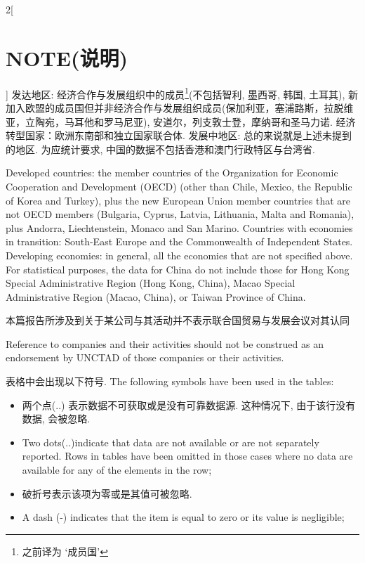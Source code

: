 \documentclass[a4paper, UTF8, 12pt]{article}
\begin{document}
\begin{paracol}{2}[\section{NOTE(说明)}]
    \switchcolumn*
    发达地区: 经济合作与发展组织中的成员\footnote{之前译为 `成员国'}(不包括智利, 墨西哥, 韩国, 土耳其), 新加入欧盟的成员国但并非经济合作与发展组织成员\footnotemark[3](保加利亚，塞浦路斯，拉脱维亚，立陶宛，马耳他和罗马尼亚), 安道尔，列支敦士登，摩纳哥和圣马力诺. 经济转型国家：欧洲东南部和独立国家联合体.
    发展中地区: 总的来说就是上述未提到的地区. 为应统计要求, 中国的数据不包括香港和澳门行政特区与台湾省.


    \switchcolumn
    Developed countries: the member countries of the Organization for Economic Cooperation and Development (OECD) (other than Chile, Mexico, the Republic of Korea and Turkey), plus the new European Union member countries that are not OECD members (Bulgaria, Cyprus, Latvia, Lithuania, Malta and Romania), plus Andorra, Liechtenstein, Monaco and San Marino. Countries with economies in transition: South-East Europe and the Commonwealth of Independent States. Developing economies: in general, all the economies that are not specified above. For statistical purposes, the data for China do not include those for Hong Kong Special Administrative Region (Hong Kong, China), Macao Special Administrative Region (Macao, China), or Taiwan Province of China. 

    \switchcolumn*
    本篇报告所涉及到关于某公司与其活动并不表示联合国贸易与发展会议对其认同

    \switchcolumn
    Reference to companies and their activities should not be construed as an endorsement by UNCTAD of those companies or their activities.

    \switchcolumn*
    表格中会出现以下符号.
    \switchcolumn
    The following symbols have been used in the tables: 

    \begin{itemize}
        \switchcolumn*
        \item 两个点(..) 表示数据不可获取或是没有可靠数据源. 这种情况下, 由于该行没有数据, 会被忽略.
        \switchcolumn
        \item Two dots(..)indicate that data are not available or are not separately reported. Rows in tables have been omitted in those cases where no data are available for any of the elements in the row; 
        
        \switchcolumn*
        \item 破折号表示该项为零或是其值可被忽略.
        \switchcolumn
        \item A dash (-) indicates that the item is equal to zero or its value is negligible;
        

\end{itemize}
\end{paracol}
\end{document}
